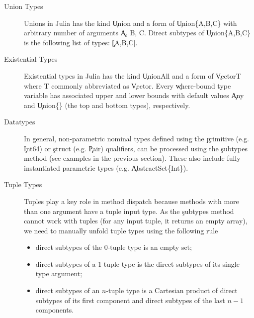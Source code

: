 \begin{description}

  \item[Union Types]
        Unions in Julia has the kind \c{Union} and a form of \c{Union\{A,B,C\}}
        with arbitrary number of arguments \c{A, B, C}.
        Direct subtypes of \c{Union\{A,B,C\}} is the following list of types: \c{[A,B,C]}.

  \item[Existential Types]
        Existential types in Julia has the kind \c{UnionAll} and a form of
        \c{Vector{T} where T} commonly abbreviated as \c{Vector}. Every
        \c{where}-bound type variable has associated upper and lower bounds with
        default values \c{Any} and \c{Union\{\}} (the top and bottom types),
        respectively. %

  \item[Datatypes]
        In general, non-parametric nominal types defined using the \c{primitive} (e.g. \c{Int64}) or
        \c{struct} (e.g. \c{Pair}) qualifiers,  can be processed
        using the \c{subtypes} method (see examples in the previous section).%
        These also include fully-instantiated parametric types
        (e.g. \c{AbstractSet\{Int\}}).

  \item[Tuple Types]
        Tuples play a key role in method dispatch because methods with
        more than one argument have a tuple input type. As the \c{subtypes} method
        cannot work with tuples (for any input tuple, it returns an empty
        array), we need to manually unfold tuple types using the following rule
        \begin{itemize}
          \item direct subtypes of the 0-tuple type is an empty set;
          \item direct subtypes of a 1-tuple type is the direct subtypes of its
          single type argument;
          \item direct subtypes of an $n$-tuple type is a Cartesian product of
          direct subtypes of its first component and direct subtypes of the last
          $n-1$ components.
        \end{itemize}

\end{description}

